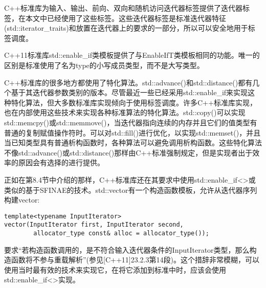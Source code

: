 C++标准库为输入、输出、前向、双向和随机访问迭代器标签提供了迭代器标签，在本文中已经使用了这些标签。这些迭代器标签是标准迭代器特征(std::iterator\_traits)和放置在迭代器上的要求的一部分，所以可以安全地用于标签调度。

C++11标准库std::enable\_if类模板提供了与EnableIfT类模板相同的功能。唯一的区别是标准使用了名为type的小写成员类型，而不是大写类型。

C++标准库的很多地方都使用了特化算法。std::advance()和std::distance()都有几个基于其迭代器参数类别的版本。尽管最近一些已经采用std::enable\_if来实现这种特化算法，但大多数标准库实现倾向于使用标签调度。许多C++标准库实现，也在内部使用这些技术来实现各种标准算法的特化算法。std::copy()可以实现std::memcpy()或std::memmove()，当迭代器指向连续的内存并且它们的值类型有普通的复制赋值操作符时。可以对std::fill()进行优化，以实现std::memset()，并且当已知类型具有普通析构函数时，各种算法可以避免调用析构函数。这些特化算法不像std::advance()或std::distance()那样由C++标准强制规定，但是实现者出于效率的原因会有选择的进行提供。

正如在第8.4节中介绍的那样，C++标准库还在其要求中使用std::enable\_if<>或类似的基于SFINAE的技术。std::vector有一个构造函数模板，允许从迭代器序列构建vector:

\begin{lstlisting}[style=styleCXX]
template<typename InputIterator>
vector(InputIterator first, InputIterator second,
		allocator_type const& alloc = allocator_type());
\end{lstlisting}

要求“若构造函数调用的，是不符合输入迭代器条件的InputIterator类型，那么构造函数将不参与重载解析”(参见[C++11]23.2.3第14段)。这个措辞非常模糊，可以使用当时最有效的技术来实现它，在将它添加到标准中时，应该会使用std::enable\_if<>实现。
























